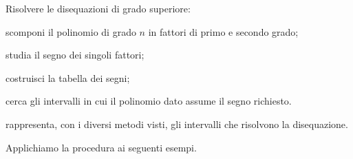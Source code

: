 \begin{procedura}
Risolvere le disequazioni di grado superiore:
\begin{enumeratea}
\item scomponi il polinomio di grado $n$ in fattori di primo e secondo grado;
\item studia il segno dei singoli fattori;
\item costruisci la tabella dei segni;
\item cerca gli intervalli in cui il polinomio dato assume il segno richiesto.
\item rappresenta, con i diversi metodi visti, gli intervalli che 
 risolvono la disequazione.
\end{enumeratea}
\end{procedura}

Applichiamo la procedura ai seguenti esempi.


